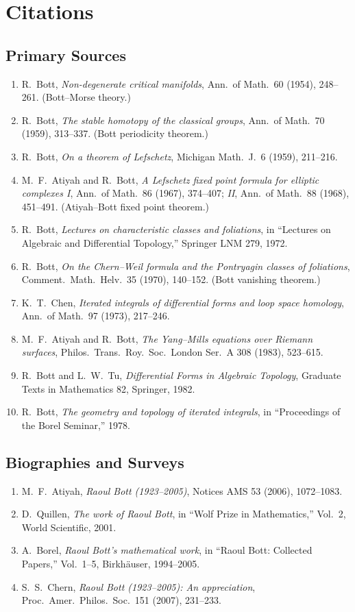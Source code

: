 \section{Citations}\subsection*{Primary Sources}
\begin{enumerate}
    \item R.\ Bott, \textit{Non-degenerate critical manifolds}, Ann.\ of Math.\ 60 (1954), 248--261. (Bott--Morse theory.)
    \item R.\ Bott, \textit{The stable homotopy of the classical groups}, Ann.\ of Math.\ 70 (1959), 313--337. (Bott periodicity theorem.)
    \item R.\ Bott, \textit{On a theorem of Lefschetz}, Michigan Math.\ J.\ 6 (1959), 211--216.
    \item M.\ F.\ Atiyah and R.\ Bott, \textit{A Lefschetz fixed point formula for elliptic complexes I}, Ann.\ of Math.\ 86 (1967), 374--407; \textit{II}, Ann.\ of Math.\ 88 (1968), 451--491. (Atiyah--Bott fixed point theorem.)
    \item R.\ Bott, \textit{Lectures on characteristic classes and foliations}, in ``Lectures on Algebraic and Differential Topology,'' Springer LNM 279, 1972.
    \item R.\ Bott, \textit{On the Chern--Weil formula and the Pontryagin classes of foliations}, Comment.\ Math.\ Helv.\ 35 (1970), 140--152. (Bott vanishing theorem.)
    \item K.\ T.\ Chen, \textit{Iterated integrals of differential forms and loop space homology}, Ann.\ of Math.\ 97 (1973), 217--246.
    \item M.\ F.\ Atiyah and R.\ Bott, \textit{The Yang--Mills equations over Riemann surfaces}, Philos.\ Trans.\ Roy.\ Soc.\ London Ser.\ A 308 (1983), 523--615.
    \item R.\ Bott and L.\ W.\ Tu, \textit{Differential Forms in Algebraic Topology}, Graduate Texts in Mathematics 82, Springer, 1982.
    \item R.\ Bott, \textit{The geometry and topology of iterated integrals}, in ``Proceedings of the Borel Seminar,'' 1978.
\end{enumerate}

\subsection*{Biographies and Surveys}
\begin{enumerate}
    \item M.\ F.\ Atiyah, \textit{Raoul Bott (1923--2005)}, Notices AMS 53 (2006), 1072--1083.
    \item D.\ Quillen, \textit{The work of Raoul Bott}, in ``Wolf Prize in Mathematics,'' Vol.\ 2, World Scientific, 2001.
    \item A.\ Borel, \textit{Raoul Bott's mathematical work}, in ``Raoul Bott: Collected Papers,'' Vol.\ 1--5, Birkh\"auser, 1994--2005.
    \item S.\ S.\ Chern, \textit{Raoul Bott (1923--2005): An appreciation}, Proc.\ Amer.\ Philos.\ Soc.\ 151 (2007), 231--233.
\end{enumerate}

